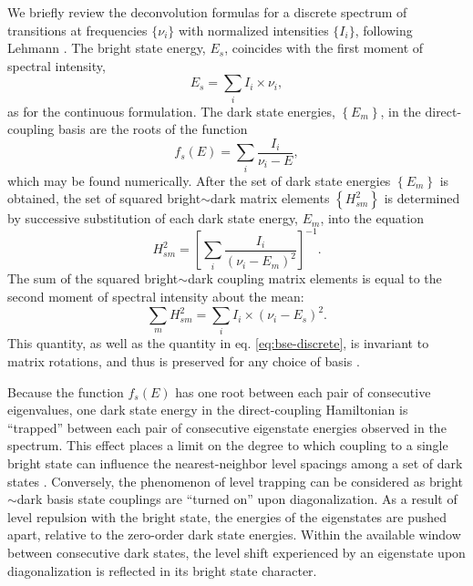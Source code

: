 \documentclass[12pt]{mitthesis}
\begin{document}
We briefly review the deconvolution formulas for a discrete spectrum
of transitions at frequencies $\lbrace \nu_i \rbrace$ with normalized
intensities $\lbrace I_i \rbrace$, following Lehmann \cite{lehmann91}.
The bright state energy, $E_s$, coincides with the first moment of
spectral intensity,
\begin{equation}
  \label{eq:bse-discrete}
  E_s = \sum_i I_i \times \nu_i,
\end{equation}
as for the continuous formulation.  The dark state energies, $\left
  \lbrace E_m \right \rbrace$, in the direct-coupling basis are the
roots of the function
\begin{equation}
  f_s(E) = \sum_i \frac{I_i}{\nu_i - E},
\end{equation}
which may be found numerically.  After the set of dark state energies
$\left \lbrace E_m \right \rbrace$ is obtained, the set of squared
bright$\sim$dark matrix elements $\left \lbrace H_{sm}^2 \right
\rbrace$ is determined by successive substitution of each dark state
energy, $E_m$, into the equation
\begin{equation}
  H_{sm}^2 = 
  \left [
    \sum_i \frac{I_i}{(\nu_i - E_m)^2}
  \right ]^{-1}.
\end{equation}
The sum of the squared bright$\sim$dark coupling matrix elements is
equal to the second moment of spectral intensity about the mean:
\begin{equation}
  \label{eq:me-sum-discrete}
  \sum_m H_{sm}^2 = \sum_i I_i \times (\nu_i - E_s)^2.
\end{equation}
This quantity, as well as the quantity in eq. \ref{eq:bse-discrete},
is invariant to matrix rotations, and thus is preserved for any choice
of basis \cite{lehmann91}.

Because the function $f_s(E)$ has one root between each pair of
consecutive eigenvalues, one dark state energy in the direct-coupling
Hamiltonian is ``trapped'' between each pair of consecutive eigenstate
energies observed in the spectrum.  This effect places a limit on the
degree to which coupling to a single bright state can influence the
nearest-neighbor level spacings among a set of dark states
\cite{coy87}.  Conversely, the phenomenon of level trapping can be
considered as bright$\sim$dark basis state couplings are ``turned on''
upon diagonalization.  As a result of level repulsion with the bright
state, the energies of the eigenstates are pushed apart, relative to
the zero-order dark state energies.  Within the available window
between consecutive dark states, the level shift experienced by an
eigenstate upon diagonalization is reflected in its bright state
character.  
\end{document}
